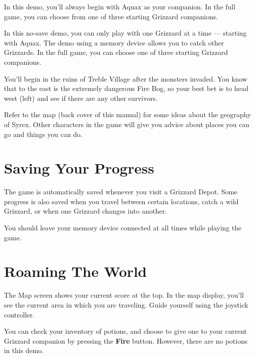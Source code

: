 \documentclass[10pt,twocolumn,openany,article]{memoir}
\begin{document}
\else

In this demo,  you'll always begin with Aquax as  your companion. In the
full game, you can choose from one of three starting Grizzard companions.

\fi
\fi
\ifdefined\NOSAVE

In this no-save demo, you can only  play with one Grizzard at a time ---
starting with Aquax. The demo using  a memory device allows you to catch
other Grizzards. In the full game,  you can choose one of three starting
Grizzard companions.

\fi

You'll begin in the ruins of  Treble Village after the monsters invaded.
You know that to  the east is the extremely dangerous  Fire Bog, so your
best  bet   is  to  head   west  (left)  and   see  if  there   are  any
other survivors.

Refer to the  map (back cover of  this manual) for some  ideas about the
geography of  Syrex. Other characters in  the game will give  you advice
about places you can go and things you can do.

\ifdefined\NOSAVE\else

\section{Saving Your Progress}

The game  is automatically  saved whenever you  visit a  Grizzard Depot.
Some progress is  also saved when you travel  between certain locations,
catch a wild Grizzard, or when one Grizzard changes into another.

\ifdefined\ATARIAGESAVE\else

You should leave your memory device connected at all times while playing
the game.

\fi \fi

\section{Roaming The World}

The Map screen shows your current score  at the top. In the map display,
you'll see the  current area in which you are  traveling. Guide yourself
using the joystick controller.

You can check your inventory of potions,  and choose to give one to your
current  Grizzard  companion  by   pressing  the  \textbf{Fire}  button.
\ifdefined\DEMO However, there are no potions in this demo. \fi
\end{document}

